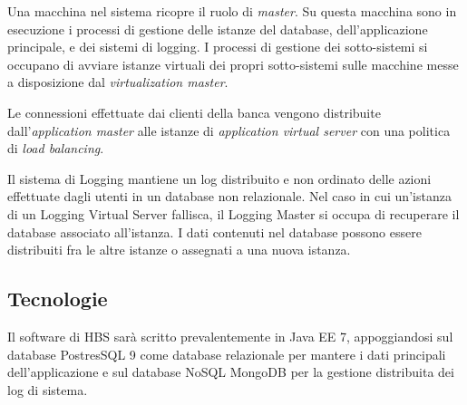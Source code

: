 Una macchina nel sistema ricopre il ruolo di \emph{master}.
Su questa macchina sono in esecuzione i processi di gestione delle istanze del database, dell'applicazione principale, e dei sistemi di logging.
I processi di gestione dei sotto-sistemi si occupano di avviare istanze virtuali dei propri sotto-sistemi sulle macchine messe a disposizione dal \emph{virtualization master}.

Le connessioni effettuate dai clienti della banca vengono distribuite dall'\emph{application master} alle istanze di \emph{application virtual server} con una politica di \emph{load balancing}.

Il sistema di Logging mantiene un log distribuito e non ordinato delle azioni effettuate dagli utenti in un database non relazionale.
Nel caso in cui un'istanza di un Logging Virtual Server fallisca, il Logging Master si occupa di recuperare il database associato all'istanza.
I dati contenuti nel database possono essere distribuiti fra le altre istanze o assegnati a una nuova istanza.

\subsection{Tecnologie}

Il software di HBS sar\`a scritto prevalentemente in Java EE 7, appoggiandosi sul database PostresSQL 9 come database relazionale per mantere i dati principali dell'applicazione e sul database NoSQL MongoDB per la gestione distribuita dei log di sistema.

